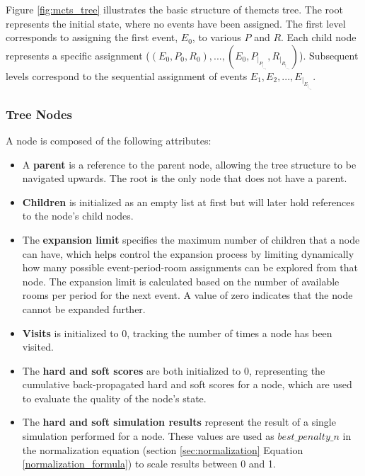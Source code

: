 Figure \ref{fig:mcts_tree} illustrates the basic structure of the\ac{mcts} tree. The root represents the initial state, where no events have been assigned. The first level corresponds to assigning the first event, \(E_0\), to various \(P\) and \(R\). Each child node represents a specific assignment (\((E_0,P_0,R_0),...,(E_0,P_|_P_|_-_1,R_|_R_|_-_1)\)). Subsequent levels correspond to the sequential assignment of events \(E_1, E_2, ..., E_|_E_|_-_1\).

\subsubsection{Tree Nodes}

A node is composed of the following attributes:

\begin{itemize}

\item A \textbf{parent} is a reference to the parent node, allowing the tree structure to be navigated upwards. The root is the only node that does not have a parent.

\item \textbf{Children} is initialized as an empty list at first but will later hold references to the node's child nodes. 

\item The \textbf{expansion limit} specifies the maximum number of children that a node can have, which helps control the expansion process by limiting dynamically how many possible event-period-room assignments can be explored from that node. The expansion limit is calculated based on the number of available rooms per period for the next event. A value of zero indicates that the node cannot be expanded further.

\item \textbf{Visits} is initialized to 0, tracking the number of times a node has been visited.

\item The \textbf{hard and soft scores} are both initialized to 0, representing the cumulative back-propagated hard and soft scores for a node, which are used to evaluate the quality of the node's state.

\item The \textbf{hard and soft simulation results} represent the result of a single simulation performed for a node. These values are used as \(best\_penalty\_n\) in the normalization equation (section \ref{sec:normalization} Equation \ref{normalization_formula}) to scale results between 0 and 1.
\end{itemize}


